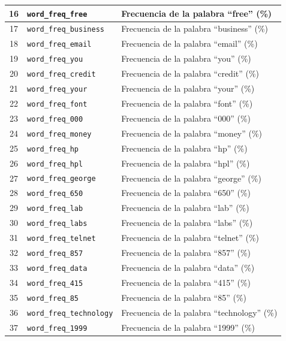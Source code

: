 \documentclass[a4paper,11pt]{book}
\begin{document}
\begin{longtable}{|c|l|l|}
16 & \texttt{word\_freq\_free} & Frecuencia de la palabra ``free'' (\%) \\ \hline
17 & \texttt{word\_freq\_business} & Frecuencia de la palabra ``business'' (\%) \\ \hline
18 & \texttt{word\_freq\_email} & Frecuencia de la palabra ``email'' (\%) \\ \hline
19 & \texttt{word\_freq\_you} & Frecuencia de la palabra ``you'' (\%) \\ \hline
20 & \texttt{word\_freq\_credit} & Frecuencia de la palabra ``credit'' (\%) \\ \hline
21 & \texttt{word\_freq\_your} & Frecuencia de la palabra ``your'' (\%) \\ \hline
22 & \texttt{word\_freq\_font} & Frecuencia de la palabra ``font'' (\%) \\ \hline
23 & \texttt{word\_freq\_000} & Frecuencia de la palabra ``000'' (\%) \\ \hline
24 & \texttt{word\_freq\_money} & Frecuencia de la palabra ``money'' (\%) \\ \hline
25 & \texttt{word\_freq\_hp} & Frecuencia de la palabra ``hp'' (\%) \\ \hline
26 & \texttt{word\_freq\_hpl} & Frecuencia de la palabra ``hpl'' (\%) \\ \hline
27 & \texttt{word\_freq\_george} & Frecuencia de la palabra ``george'' (\%) \\ \hline
28 & \texttt{word\_freq\_650} & Frecuencia de la palabra ``650'' (\%) \\ \hline
29 & \texttt{word\_freq\_lab} & Frecuencia de la palabra ``lab'' (\%) \\ \hline
30 & \texttt{word\_freq\_labs} & Frecuencia de la palabra ``labs'' (\%) \\ \hline
31 & \texttt{word\_freq\_telnet} & Frecuencia de la palabra ``telnet'' (\%) \\ \hline
32 & \texttt{word\_freq\_857} & Frecuencia de la palabra ``857'' (\%) \\ \hline
33 & \texttt{word\_freq\_data} & Frecuencia de la palabra ``data'' (\%) \\ \hline
34 & \texttt{word\_freq\_415} & Frecuencia de la palabra ``415'' (\%) \\ \hline
35 & \texttt{word\_freq\_85} & Frecuencia de la palabra ``85'' (\%) \\ \hline
36 & \texttt{word\_freq\_technology} & Frecuencia de la palabra ``technology'' (\%) \\ \hline
37 & \texttt{word\_freq\_1999} & Frecuencia de la palabra ``1999'' (\%) \\ \hline

\end{longtable}
\end{document}
